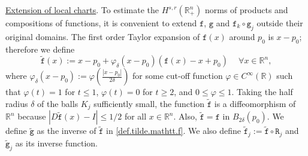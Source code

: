 \documentclass[10pt,reqno,a4paper]{article}
\numberwithin{equation}{section}
\theoremstyle{plain}
\theoremstyle{definition}
\newcommand{\R}{{\mathbb R}}
\newcommand{\ph}{\varphi}
\begin{document}
\medskip

\underline{Extension of local charts}.
To estimate the $H^{s,r}(\R^n_+)$ norms of products and compositions of functions,
it is convenient to extend $\mathtt f$, $\mathtt g$ and $\mathtt f_k \circ \mathtt g_j$ 
outside their original domains. 
The first order Taylor expansion of $\mathtt f(x)$ around $p_0$ is $x-p_0$; 
therefore we define 
\begin{equation} \label{def.tilde.mathtt.f}
\tilde{\mathtt f}(x) := 
x - p_0 + \ph_\delta(x-p_0) ( \mathtt f(x) - x + p_0 )
\quad \ \forall x \in \R^n,
\end{equation}
where $\ph_\delta(x-p_0) := \ph ( \frac{ |x-p_0| }{ 2\delta } )$  
for some cut-off function $\ph \in C^\infty(\R)$ such that $\ph(t) = 1$ for $t \leq 1$, 
$\ph(t) = 0$ for $t \geq 2$, and $0 \leq \ph \leq 1$.  
Taking the half radius $\delta$ of the balls $K_j$ sufficiently small, 
the function $\tilde{\mathtt f}$ is a diffeomorphism of $\R^n$ 
because $|D \tilde{\mathtt f}(x) - I| \leq 1/2$ for all $x \in \R^n$. 
Also, $\tilde{\mathtt f} = \mathtt f$ in $B_{2\delta}(p_0)$. 
We define $\tilde{\mathtt g}$ as the inverse of $\tilde{\mathtt f}$ in \eqref{def.tilde.mathtt.f}.  
We also define $\tilde{\mathtt f}_j := \tilde{\mathtt f} \circ \mathtt R_j$ 
and $\tilde{\mathtt g}_j$ as its inverse function. 



\medskip
\end{document}
